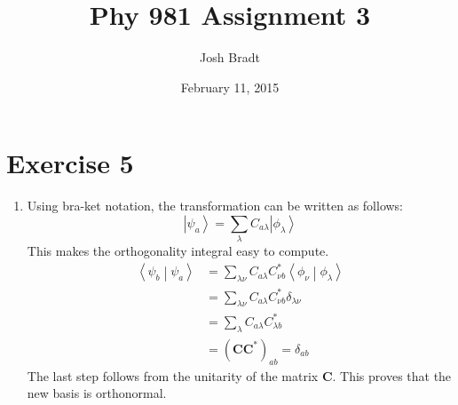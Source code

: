 \documentclass{article}
\title{Phy 981 Assignment 3}
\author{Josh Bradt}
\date{February 11, 2015}
\newcommand{\ket}[1]{\ensuremath{\left| #1 \right>}}
\newcommand{\proj}[2]{\ensuremath{\left<#1 \middle| #2 \right>}}
\begin{document}
\maketitle

\section*{Exercise 5}

	\begin{enumerate}
		\item Using bra-ket notation, the transformation can be written as follows:
		\begin{equation}
			\ket{\psi_a} = \sum_{\lambda} C_{a \lambda} \ket{\phi_\lambda}  \label{eq:0dtrans}
		\end{equation}
		This makes the orthogonality integral easy to compute.
		\begin{align*}
			\proj{\psi_b}{\psi_a} &= \sum_{\lambda \nu} C_{a \lambda} C^*_{\nu b} \proj{\phi_\nu}{\phi_\lambda} \\
								  &= \sum_{\lambda \nu} C_{a \lambda} C^*_{\nu b} \delta_{\lambda\nu} \\
								  &= \sum_{\lambda} C_{a \lambda} C^*_{\lambda b} \\
								  &= (\mathbf{C}\mathbf{C}^*)_{ab} = \delta_{ab}
		\end{align*}
		The last step follows from the unitarity of the matrix $\mathbf{C}$. This proves that the new basis is orthonormal.


\end{enumerate}
\end{document}
